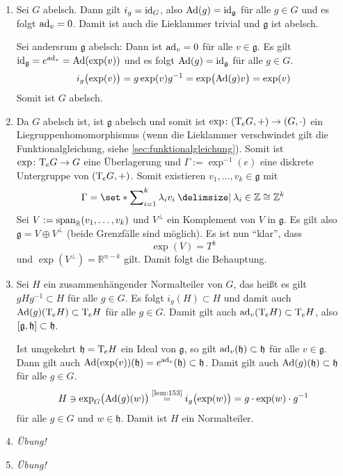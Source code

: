 \begin{beweis}
	\begin{enumerate}[1)]
		\item Sei $G$ abelsch. Dann gilt $i_g=\id_G$, also $\Ad(g) = \id_{\mathfrak{g}}$ für alle $g \in G$ und es folgt $\ad_v=0$. Damit ist auch die Lieklammer trivial und $\mathfrak{g}$ ist abelsch.
		
		Sei andersrum $\mathfrak{g}$ abelsch: Dann ist $\ad_v=0$ für alle $v \in \mathfrak{g}$. Es gilt $\id_{\mathfrak{g}} = e^{\ad_v} = \Ad \enbrace*{\exp(v)}$ und es folgt $\Ad(g) = \id_{\mathfrak{g}} $ für alle $g \in G$.
		\[
			i_g \enbrace[\big]{\exp(v)} =  g \exp(v) g^{-1} = \exp \enbrace[\big]{\Ad(g)v} = \exp(v)
		\]
		Somit ist $G$ abelsch.
		\item Da $G$ abelsch ist, ist $\mathfrak{g}$ abelsch und somit ist $\exp \colon (\Tmap_eG,+) \to (G,\cdot )$ ein Liegruppenhomomorphismus (wenn die Lieklammer verschwindet gilt die Funktionalgleichung, siehe \cref{sec:funktionalgleichung}).
		Somit ist $\exp \colon \Tmap_e G \to G$ eine Überlagerung und $\Gamma := \exp^{-1}(e)$ eine diskrete Untergruppe von $(\Tmap_e G,+)$.
		Somit existieren $v_1, \ldots, v_k \in \mathfrak{g}$ mit
		\[
			\Gamma = \set*{\sum\nolimits_{i=1}^{k} \lambda_i v_i \given \lambda_i \in \mathbb{Z}} \cong \mathbb{Z}^k
		\]
		Sei $V := \Span_\mathbb{R}(v_1,\ldots ,v_k)$ und $V^\bot$ ein Komplement von $V$ in $\mathfrak{g}$.
		Es gilt also $\mathfrak{g} = V \oplus V^\bot$ (beide Grenzfälle sind möglich).
		Es ist nun \enquote{klar}, dass 
		\[
			\exp(V) = T^k
		\]
		und $\exp(V^\bot) = \mathbb{R}^{n-k}$ gilt. 
		Damit folgt die Behauptung.
		\item Sei $H$ ein zusammenhängender Normalteiler von $G$, das heißt es gilt $g H g^{-1} \subset H$ für alle $g \in G$.
		Es folgt $i_g(H) \subset H$ und damit auch $\Ad(g)(\Tmap_eH) \subset \Tmap_eH$ für alle $g \in G$.
		Damit gilt auch $\ad_v(\Tmap_e H) \subset \Tmap_e H$, also $\benbrace*{\mathfrak{g},\mathfrak{h}}\subset \mathfrak{h}$.
		
		Ist umgekehrt $\mathfrak{h} = \Tmap_e H$ ein Ideal von $\mathfrak{g}$, so gilt $\ad_v(\mathfrak{h}) \subset \mathfrak{h}$ für alle $v \in \mathfrak{g}$.
		Dann gilt auch $\Ad \enbrace*{\exp (v)}(\mathfrak{h}) = e^{\ad_v}(\mathfrak{h}) \subset \mathfrak{h}$.
		Damit gilt auch $\Ad(g)(\mathfrak{h}) \subset \mathfrak{h}$ für alle $g \in G$.
		\begin{align}
			H \ni \exp_G \enbrace[\big]{\Ad(g)(w)} \StackText{\ref{lem:153}}{=} i_g \enbrace[\big]{\exp(w)}= g \cdot \exp(w) \cdot g^{-1} 
		\end{align}
		für alle $g \in G$ und $w \in \mathfrak{h}$.
		Damit ist $H$ ein Normalteiler.
		\item \emph{Übung!}
		\item \emph{Übung!}\qedhere
	\end{enumerate}
\end{beweis}


